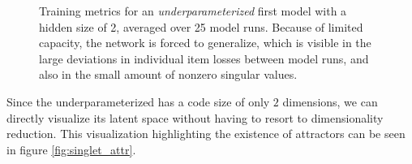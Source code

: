 \documentclass[11pt]{article}
\theoremstyle{remark}
\begin{document}
\begin{figure}%
  \centering
  \caption{Training metrics for an \textit{underparameterized} first model with a hidden size of 2, averaged over 25 model runs. Because of limited capacity, the network is forced to generalize, which is visible in the large deviations in individual item losses between model runs, and also in the small amount of nonzero singular values.}%
  \label{fig:under}%
\end{figure}

Since the underparameterized has a code size of only $2$ dimensions, we can directly visualize its latent space without having to resort to dimensionality reduction. This visualization highlighting the existence of attractors can be seen in figure \ref{fig:singlet_attr}.
\end{document}
